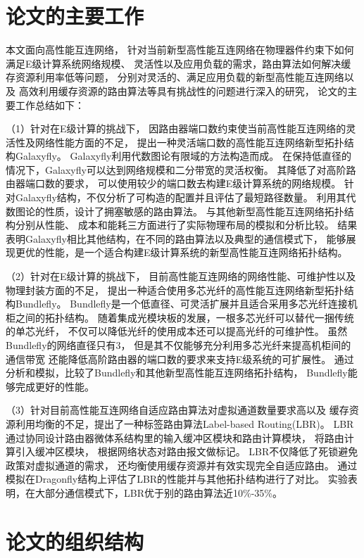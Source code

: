 \section{论文的主要工作}
本文面向高性能互连网络，
针对当前新型高性能互连网络在物理器件约束下如何满足E级计算系统网络规模、
灵活性以及应用负载的需求，路由算法如何解决缓存资源利用率低等问题，
分别对灵活的、满足应用负载的新型高性能互连网络以及
高效利用缓存资源的路由算法等具有挑战性的问题进行深入的研究，
论文的主要工作总结如下：

（1）针对在E级计算的挑战下，
因路由器端口数约束使当前高性能互连网络的灵活性及网络性能方面的不足，
提出一种灵活端口数的高性能互连网络新型拓扑结构Galaxyfly。
Galaxyfly利用代数图论有限域的方法构造而成。
在保持低直径的情况下，Galaxyfly可以达到网络规模和二分带宽的灵活权衡。
其降低了对高阶路由器端口数的要求，
可以使用较少的端口数去构建E级计算系统的网络规模。
针对Galaxyfly结构，不仅分析了可构造的配置并且评估了最短路径数量。
利用其代数图论的性质，设计了拥塞敏感的路由算法。
与其他新型高性能互连网络拓扑结构分别从性能、
成本和能耗三方面进行了实际物理布局的模拟和分析比较。
结果表明Galaxyfly相比其他结构，在不同的路由算法以及典型的通信模式下，
能够展现更优的性能，是一个适合构建E级计算系统的新型高性能互连网络拓扑结构。

（2）针对在E级计算的挑战下，
目前高性能互连网络的网络性能、可维护性以及物理封装方面的不足，
提出一种适合使用多芯光纤的高性能互连网络新型拓扑结构Bundlefly。
Bundlefly是一个低直径、可灵活扩展并且适合采用多芯光纤连接机柜之间的拓扑结构。
随着集成光模块板的发展，一根多芯光纤可以替代一捆传统的单芯光纤，
不仅可以降低光纤的使用成本还可以提高光纤的可维护性。
虽然Bundlefly的网络直径只有3，
但是其不仅能够充分利用多芯光纤来提高机柜间的通信带宽
还能降低高阶路由器的端口数的要求来支持E级系统的可扩展性。
通过分析和模拟，比较了Bundlefly和其他新型高性能互连网络拓扑结构，
Bundlefly能够完成更好的性能。

（3）针对目前高性能互连网络自适应路由算法对虚拟通道数量要求高以及
缓存资源利用均衡的不足，提出了一种标签路由算法Label-based Routing(LBR)。
LBR通过协同设计路由器微体系结构里的输入缓冲区模块和路由计算模块，
将路由计算引入缓冲区模块，
根据网络状态对路由报文做标记。
LBR不仅降低了死锁避免政策对虚拟通道的需求，
还均衡使用缓存资源并有效实现完全自适应路由。
通过模拟在Dragonfly结构上评估了LBR的性能并与其他拓扑结构进行了对比。
实验表明，在大部分通信模式下，LBR优于别的路由算法近10\%-35\%。

\section{论文的组织结构}


